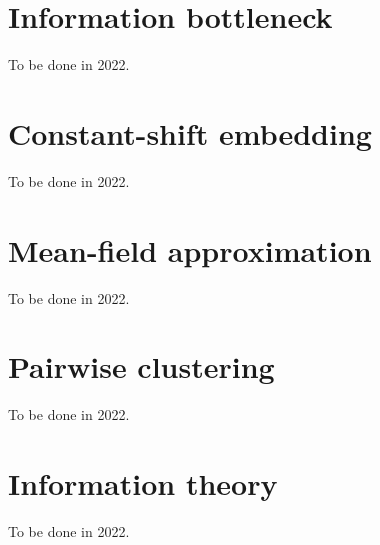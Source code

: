 \documentclass[12pt]{book}
\theoremstyle{definition}
\begin{document}
\maketitle

\newcommand{\todo}[1]{{\color{red} ToDo: #1}}
\newcommand{\prob}{\mathbf{P}}

\newcommand{\dir}{Introduction}


\renewcommand{\dir}{maximum_entropy_posterior_agreement}


\renewcommand{\dir}{simulated_annealing}


\renewcommand{\dir}{deterministic_annealing}


\renewcommand{\dir}{laplace_method}


\renewcommand{\dir}{histogram_clustering}


\chapter{Information bottleneck}

To be done in 2022.

\chapter{Constant-shift embedding}

To be done in 2022.

\chapter{Mean-field approximation}

To be done in 2022.

%

\chapter{Pairwise clustering}

To be done in 2022.

\renewcommand{\dir}{posterior_agreement}





\appendix

\chapter{Information theory}

To be done in 2022.

\renewcommand{\dir}{em_algorithm}

\end{document}
